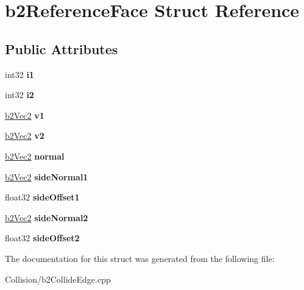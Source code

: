 \hypertarget{structb2ReferenceFace}{}\section{b2\+Reference\+Face Struct Reference}
\label{structb2ReferenceFace}
\subsection*{Public Attributes}
\begin{DoxyCompactItemize}
\item 
\mbox{\label{structb2ReferenceFace_a987d346858f5c1dd1de0dfddab779324}} 
int32 {\bfseries i1}
\item 
\mbox{\label{structb2ReferenceFace_a838ab3e4a81b71cfaa450eb214584353}} 
int32 {\bfseries i2}
\item 
\mbox{\label{structb2ReferenceFace_a20165b58f2e81b78ed3a099ef85737ac}} 
\mbox{\hyperlink{structb2Vec2}{b2\+Vec2}} {\bfseries v1}
\item 
\mbox{\label{structb2ReferenceFace_aa89eb5b51e9ee680b97c33041658f9ab}} 
\mbox{\hyperlink{structb2Vec2}{b2\+Vec2}} {\bfseries v2}
\item 
\mbox{\label{structb2ReferenceFace_a4ba73696920306d3c8fecc35a4433029}} 
\mbox{\hyperlink{structb2Vec2}{b2\+Vec2}} {\bfseries normal}
\item 
\mbox{\label{structb2ReferenceFace_a478026ee3fa0d8d1349b01928eb9e947}} 
\mbox{\hyperlink{structb2Vec2}{b2\+Vec2}} {\bfseries side\+Normal1}
\item 
\mbox{\label{structb2ReferenceFace_a7e2a902ed8f499fbb4305d51ce687876}} 
float32 {\bfseries side\+Offset1}
\item 
\mbox{\label{structb2ReferenceFace_ad272f9369fbc1d28f60f77defd757dbd}} 
\mbox{\hyperlink{structb2Vec2}{b2\+Vec2}} {\bfseries side\+Normal2}
\item 
\mbox{\label{structb2ReferenceFace_a7fa70d9f4bfc4cdf792408ffe204d017}} 
float32 {\bfseries side\+Offset2}
\end{DoxyCompactItemize}


The documentation for this struct was generated from the following file\+:\begin{DoxyCompactItemize}
\item 
Collision/b2\+Collide\+Edge.\+cpp\end{DoxyCompactItemize}
